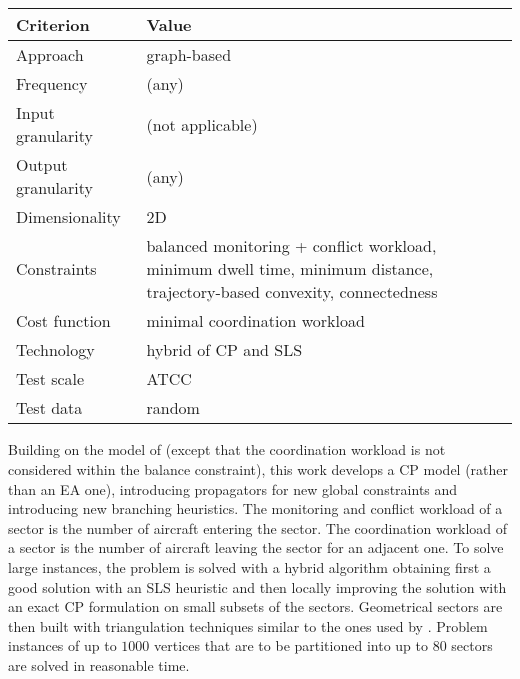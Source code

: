 \documentclass[a4paper,12pt]{article}
\begin{document}
\subsection{\cite{TranDac:RAIRO05}}

\begin{center}
\begin{tabular}{|l|l|}
  \hline
  Criterion & Value \\
  \hline\hline
  Approach & graph-based \\ \hline
  Frequency & (any) \\ \hline
  Input granularity & (not applicable) \\ \hline
  Output granularity & (any) \\ \hline
  Dimensionality & 2D \\ \hline
  Constraints & \parbox{11.5cm}{balanced monitoring + conflict
    workload, minimum dwell time, minimum distance,
    trajectory-based convexity, connectedness} \\ \hline
  Cost function & minimal coordination workload \\ \hline
  Technology & hybrid of CP and SLS \\ \hline
  Test scale & ATCC \\ \hline
  Test data & random \\ \hline
\end{tabular}
\end{center}
Building on the model of \cite{Delahaye:ICEC98} (except that the
coordination workload is not considered within the balance
constraint), this work develops a CP model (rather than an EA one),
introducing propagators for new global constraints and introducing new
branching heuristics.  The monitoring and conflict workload of a
sector is the number of aircraft entering the sector.  The
coordination workload of a sector is the number of aircraft leaving
the sector for an adjacent one.  To solve large instances, the problem
is solved with a hybrid algorithm obtaining first a good solution with
an SLS heuristic and then locally improving the solution with an exact
CP formulation on small subsets of the sectors.  Geometrical sectors
are then built with triangulation techniques similar to the ones used
by \cite{Delahaye:ICEC98}.  Problem instances of up to $1000$ vertices
that are to be partitioned into up to $80$ sectors are solved in
reasonable time.

\subsection{\cite{Bichot:ATM07}}
\end{document}
